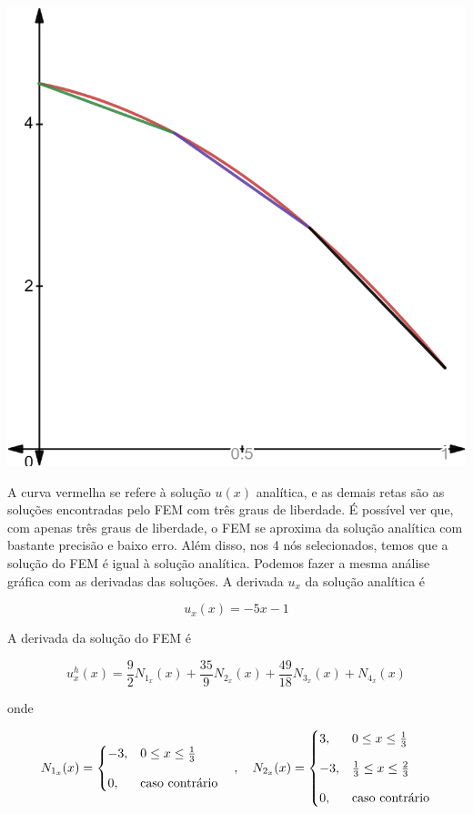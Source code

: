 \documentclass[12pt]{scrartcl}
\begin{document}
\begin{center}
    \includegraphics[scale=0.25]{grafico_zoom_ux_AA03.png}
\end{center}

A curva vermelha se refere à solução $u(x)$ analítica, e as demais retas são as soluções encontradas pelo FEM com três graus de liberdade.
É possível ver que, com apenas três graus de liberdade, o FEM se aproxima da solução analítica com bastante precisão e baixo erro.
Além disso, nos 4 nós selecionados, temos que a solução do FEM é igual à solução analítica.
\newline
Podemos fazer a mesma análise gráfica com as derivadas das soluções. A derivada $u_x$ da solução analítica é

\begin{equation}\label{eqDu}
    u_x(x) = -5x - 1
\end{equation}

A derivada da solução do FEM é

\begin{equation}\label{eqUfemD}
    u_x^h(x) = \frac{9}{2}N_{1_x}(x) + \frac{35}{9}N_{2_x}(x) + \frac{49}{18}N_{3_x}(x) + N_{4_x}(x)
\end{equation}

onde

\[
    N_{1_x}(x) = \begin{cases}
        -3, & 0 \leq x \leq \frac{1}{3} \\
        \noalign{\vskip9pt}
        0,      & \textrm{caso contrário}
    \end{cases}
    \quad , \quad
    N_{2_x}(x) = \begin{cases}
        3,     & 0 \leq x \leq \frac{1}{3}           \\
        \noalign{\vskip9pt}
        -3, & \frac{1}{3} \leq x \leq \frac{2}{3} \\
        \noalign{\vskip9pt}
        0,      & \textrm{caso contrário}
    \end{cases}
\]
\end{document}
